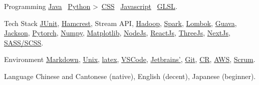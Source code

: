 
\begin{cvskills}
  \cvskill
    {Programming}
    {\href{https://www.java.com/en/}{Java} \approx\, \href{https://www.python.org/}{Python} >\, \href{https://developer.mozilla.org/en-US/docs/Web/CSS}{CSS} \approx\, \href{https://www.javascript.com/}{Javascript} \approx\, \href{https://www.khronos.org/opengl/wiki/OpenGL_Shading_Language}{GLSL}.}
  
  \cvskill
    {Tech Stack} %
    {\href{https://junit.org/junit4/}{JUnit}, \href{http://hamcrest.org/JavaHamcrest/index}{Hamcrest}, Stream API, \href{https://hadoop.apache.org/}{Hadoop}, \href{https://spark.apache.org/}{Spark}, \href{https://projectlombok.org/}{Lombok}, \href{https://github.com/google/guava}{Guava}, \href{https://github.com/FasterXML/jackson}{Jackson}, \href{https://pytorch.org/}{Pytorch}, \href{https://numpy.org/}{Numpy}, \href{https://matplotlib.org/}{Matplotlib}, \href{https://nodejs.org/en/}{NodeJs}, \href{https://reactjs.org/}{ReactJs}, \href{https://threejs.org/}{ThreeJs}, \href{https://nextjs.org/}{NextJs}, \href{https://sass-lang.com/}{SASS/SCSS}.}  %



  \cvskill
    {Environment} %
    {\href{https://en.wikipedia.org/wiki/Markdown}{Markdown}, \href{https://en.wikipedia.org/wiki/Unix}{Unix}, \href{https://www.latex-project.org/}{latex}, \href{https://code.visualstudio.com/}{VSCode}, \href{https://www.jetbrains.com/}{Jetbrains'}, \href{https://git-scm.com/}{Git}, \href{https://en.wikipedia.org/wiki/Code_review}{CR}, \href{https://aws.amazon.com/}{AWS}, \href{https://www.scrum.org/resources/what-is-scrum}{Scrum}.}

  \cvskill
    {Language}
    {Chinese and Cantonese (native), English (decent), Japanese (beginner).}

  
\end{cvskills}
